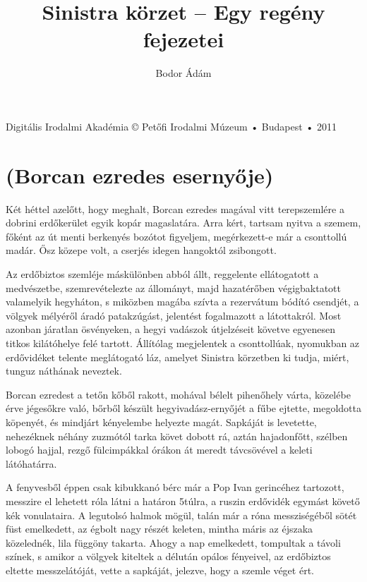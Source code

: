 \documentclass{IEEEtran}
\author{ Bodor Ádám}
\title{Sinistra körzet -- Egy regény fejezetei}
\begin{document}
\maketitle

\vspace{1cm}

Digitális Irodalmi Akadémia © Petőfi Irodalmi Múzeum • Budapest • 2011

\section{(Borcan ezredes esernyője)}

Két héttel azelőtt, hogy meghalt, Borcan ezredes magával vitt terepszemlére a
dobrini erdőkerület egyik kopár magaslatára. Arra kért, tartsam nyitva a
szemem, főként az út menti berkenyés bozótot figyeljem, megérkezett-e már a
csonttollú madár. Ősz közepe volt, a cserjés idegen hangoktól zsibongott.

Az erdőbiztos szemléje máskülönben abból állt, reggelente ellátogatott a
medvészetbe, szemrevételezte az állományt, majd hazatérőben végigbaktatott
valamelyik hegyháton, s miközben magába szívta a rezervátum bódító csendjét, a
völgyek mélyéről áradó patakzúgást, jelentést fogalmazott a látottakról. Most
azonban járatlan ösvényeken, a hegyi vadászok útjelzéseit követve egyenesen
titkos kilátóhelye felé tartott. Állítólag megjelentek a csonttollúak,
nyomukban az erdővidéket telente meglátogató láz, amelyet Sinistra körzetben
ki tudja, miért, tunguz náthának neveztek.

Borcan ezredest a tetőn kőből rakott, mohával bélelt pihenőhely várta,
közelébe érve jégesőkre való, bőrből készült hegyivadász-ernyőjét a fűbe
ejtette, megoldotta köpenyét, és mindjárt kényelembe helyezte magát. Sapkáját
is levetette, nehezéknek néhány zuzmótól tarka követ dobott rá, aztán
hajadonfőtt, szélben lobogó hajjal, rezgő fülcimpákkal órákon át meredt
távcsövével a keleti látóhatárra.

A fenyvesből éppen csak kibukkanó bérc már a Pop Ivan gerincéhez tartozott,
messzire el lehetett róla látni a határon 5túlra, a ruszin erdővidék egymást
követő kék vonulataira. A legutolsó halmok mögül, talán már a róna
messziségéből sötét füst emelkedett, az égbolt nagy részét keleten, mintha
máris az éjszaka közelednék, lila függöny takarta. Ahogy a nap emelkedett,
tompultak a távoli színek, s amikor a völgyek kiteltek a délután opálos
fényeivel, az erdőbiztos eltette messzelátóját, vette a sapkáját, jelezve,
hogy a szemle véget ért.
\end{document}
